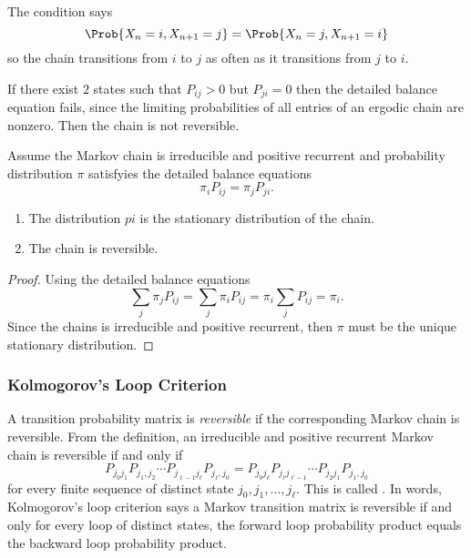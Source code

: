 \documentclass[12pt]{article}
\begin{document}
\begin{remark}
    The condition says
    \[
        \Prob{X_n =i, X_{n+1} = j} = \Prob{X_n =j, X_{n+1} = i}
    \] so the chain transitions from \( i \) to \( j \) as often as it
    transitions from \( j \) to \( i \).
\end{remark}

\begin{remark}
    If there exist \( 2 \) states such that \( P_{ij} > 0 \) but \( P_{ji}
    = 0 \) then the detailed balance equation fails, since the limiting
    probabilities of all entries of an ergodic chain are nonzero. Then
    the chain is not reversible.
\end{remark}

\begin{theorem}
    Assume the Markov chain is irreducible and positive recurrent and
    probability distribution \( \pi \) satisfyies the detailed balance
    equations
    \[
        \pi_i P_{ij} = \pi_j P_{ji}.
    \]
    \begin{enumerate}
        \item
            The distribution \( pi \) is the stationary distribution of
            the chain.
        \item
            The chain is reversible.
    \end{enumerate}
\end{theorem}

\begin{proof}
    Using the detailed balance equations
    \[
        \sum_j \pi_j P_{ij} = \sum_j \pi_i P_{ij} = \pi_i \sum_j P_{ij}
        = \pi_i.
    \] Since the chains is irreducible and positive recurrent, then \(
    \pi \) must be the unique stationary distribution.
\end{proof}

\subsubsection*{Kolmogorov's Loop Criterion}

A transition probability matrix is \emph{reversible}%
if the corresponding Markov chain is reversible.  From the definition,
an irreducible and positive recurrent Markov chain is reversible if and
only if
\[
    P_{j_0 j_1} P_{j_1,j_2} \cdots P_{j_{\ell-1} j_\ell} P_{j_\ell, j_0}
    = P_{j_0 j_\ell} P_{j_\ell j_{\ell-1}} \cdots P_{j_2 j_1} P_{j_1, j_0}
\] for every finite sequence of distinct state \( j_0, j_1, \dots, j_\ell
\). This is called .%
In words, Kolmogorov's loop criterion says a Markov transition matrix is
reversible if and only for every loop of distinct states, the forward
loop probability product equals the backward loop probability product.
\end{document}
